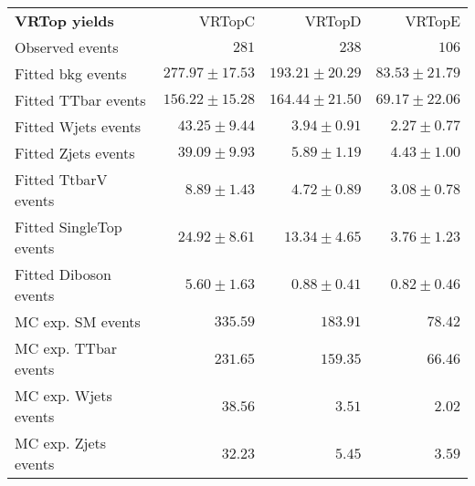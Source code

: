 

\begin{table}
\begin{center}
\setlength{\tabcolsep}{0.0pc}
{\small
\begin{tabular*}{\textwidth}{@{\extracolsep{\fill}}lrrr}
\noalign{\smallskip}\hline\noalign{\smallskip}
{\bf VRTop yields}           & VRTopC            & VRTopD            & VRTopE              \\[-0.05cm]
\noalign{\smallskip}\hline\noalign{\smallskip}
Observed events          & $281$              & $238$              & $106$                    \\
\noalign{\smallskip}\hline\noalign{\smallskip}
Fitted bkg events         & $277.97 \pm 17.53$          & $193.21 \pm 20.29$          & $83.53 \pm 21.79$              \\
\noalign{\smallskip}\hline\noalign{\smallskip}
        Fitted TTbar events         & $156.22 \pm 15.28$          & $164.44 \pm 21.50$          & $69.17 \pm 22.06$              \\
        Fitted Wjets events         & $43.25 \pm 9.44$          & $3.94 \pm 0.91$          & $2.27 \pm 0.77$              \\
        Fitted Zjets events         & $39.09 \pm 9.93$          & $5.89 \pm 1.19$          & $4.43 \pm 1.00$              \\
        Fitted TtbarV events         & $8.89 \pm 1.43$          & $4.72 \pm 0.89$          & $3.08 \pm 0.78$              \\
        Fitted SingleTop events         & $24.92 \pm 8.61$          & $13.34 \pm 4.65$          & $3.76 \pm 1.23$              \\
        Fitted Diboson events         & $5.60 \pm 1.63$          & $0.88 \pm 0.41$          & $0.82 \pm 0.46$              \\
 \noalign{\smallskip}\hline\noalign{\smallskip}
MC exp. SM events              & $335.59$          & $183.91$          & $78.42$              \\
\noalign{\smallskip}\hline\noalign{\smallskip}
        MC exp. TTbar events         & $231.65$          & $159.35$          & $66.46$              \\
        MC exp. Wjets events         & $38.56$          & $3.51$          & $2.02$              \\
        MC exp. Zjets events         & $32.23$          & $5.45$          & $3.59$              \\

\end{tabular*}}
\end{center}
\end{table}
